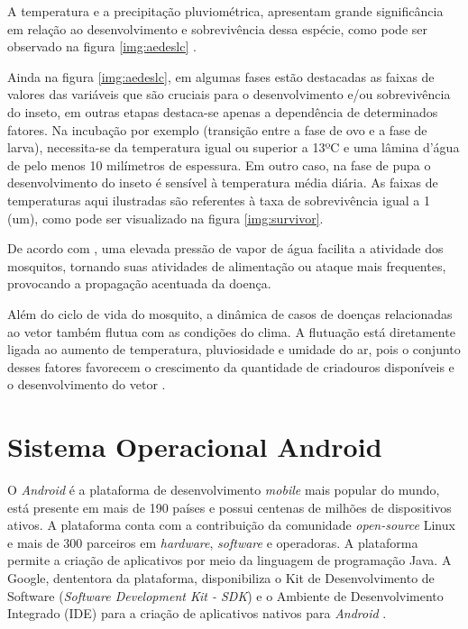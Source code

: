 A temperatura e a precipitação pluviométrica, apresentam grande significância em relação ao desenvolvimento e sobrevivência dessa espécie, como pode ser observado na figura \ref{img:aedeslc} \cite{hopp2001global, ribeiro2006associaccao}. 

Ainda na figura \ref{img:aedeslc}, em algumas fases estão destacadas as faixas de valores das variáveis que são cruciais para o desenvolvimento e/ou sobrevivência do inseto, em outras etapas destaca-se apenas a dependência de determinados fatores. Na incubação por exemplo (transição entre a fase de ovo e a fase de larva), necessita-se da temperatura igual ou superior a 13ºC e uma lâmina d’água de pelo menos 10 milímetros de espessura. Em outro caso, na fase de pupa o desenvolvimento do inseto é sensível à temperatura média diária. As faixas de temperaturas aqui ilustradas são referentes à taxa de sobrevivência igual a 1 (um), como pode ser visualizado na figura \ref{img:survivor}.


 

De acordo com , uma elevada pressão de vapor de água facilita a atividade dos mosquitos, tornando suas atividades de alimentação ou ataque mais frequentes, provocando a propagação acentuada da doença.

Além do ciclo de vida do mosquito, a dinâmica de casos de doenças relacionadas ao vetor também flutua com as condições do clima. A flutuação está diretamente ligada ao aumento de temperatura, pluviosidade e umidade do ar, pois o conjunto desses fatores favorecem o crescimento da quantidade de criadouros disponíveis e o desenvolvimento do vetor \cite{ribeiro2006associaccao}.

\section{Sistema Operacional Android}

O \textit{Android} é a plataforma de desenvolvimento \textit{mobile} mais popular do mundo, está presente em mais de 190 países e possui centenas de milhões de dispositivos ativos. A plataforma conta com a contribuição da comunidade \textit{open-source} Linux e mais de 300 parceiros em \textit{hardware}, \textit{software} e operadoras. A plataforma permite a criação de aplicativos por meio da linguagem de programação Java. A Google, dententora da plataforma, disponibiliza o Kit de Desenvolvimento de Software (\textit{Software Development Kit - SDK}) e o Ambiente de Desenvolvimento Integrado (IDE) para a criação de aplicativos nativos para \textit{Android} \cite{SITEANDROID}.


